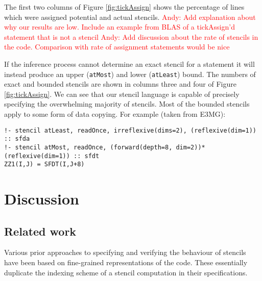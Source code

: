 \documentclass[9pt]{sigplanconf}
\newcommand{\anote}[1]{\textcolor{red}{Andy: #1}}
\theoremstyle{definition}
\newcommand{\term}[1]{\texttt{#1}}
\begin{document}
The first two columns of Figure \ref{fig:tickAssign} shows the percentage of lines which were
assigned potential and actual stencils.
\anote{Add explanation about why our results are low. Include an example from BLAS of a tickAssign'd statement that is not a stencil}
\anote{Add discussion about the rate of stencils in the code. Comparison with rate of assignment statements would be nice}

If the inference process cannot determine an exact stencil for a statement it will instead produce an upper (\term{atMost}) and lower (\term{atLeast}) bound. The numbers of exact and bounded stencils are shown in columns three and four of Figure \ref{fig:tickAssign}. We can see that our stencil language is capable of precisely specifying the overwhelming majority of stencils. Most of the bounded stencils apply to some form of data copying. For example (taken from E3MG):
\begin{verbatim}
!- stencil atLeast, readOnce, irreflexive(dims=2), (reflexive(dim=1)) :: sfda
!- stencil atMost, readOnce, (forward(depth=8, dim=2))*(reflexive(dim=1)) :: sfdt
ZZ1(I,J) = SFDT(I,J+8)
\end{verbatim}




\section{Discussion}
\label{sec:discussion}

\subsection{Related work}

Various prior approaches to specifying and verifying the behaviour
of stencils have been based on fine-grained representations of the
code. These essentially duplicate the indexing scheme of a stencil
computation in their specifications.
\end{document}
